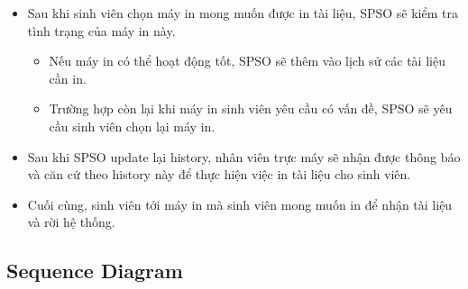 \begin{itemize}
\begin{itemize}
\end{itemize}

\item Sau khi sinh viên chọn máy in mong muốn được in tài liệu, SPSO sẽ kiểm tra tình trạng của máy in này. 
\begin{itemize}
\item Nếu máy in có thể hoạt động tốt, SPSO sẽ thêm vào lịch sử các tài liệu cần in. 
\item Trường hợp còn lại khi máy in sinh viên yêu cầu có vấn đề, SPSO sẽ yêu cầu sinh viên chọn lại máy in.\par

\end{itemize}
\item Sau khi SPSO update lại history, nhân viên trực máy sẽ nhận được thông báo và căn cứ theo history này để thực hiện việc in tài liệu cho sinh viên.  \par
\item Cuối cùng, sinh viên tới máy in mà sinh viên mong muốn in để nhận tài liệu và rời hệ thống.\par

\end{itemize}




\newpage
\subsection{Sequence Diagram}
